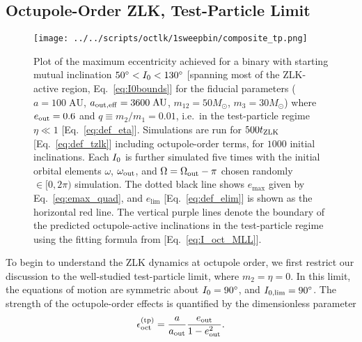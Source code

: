 \documentclass[
        fleqn,
        usenatbib,
    ]{mnras}
\newlength{\colummwidth}
\begin{document}
\subsection{Octupole-Order ZLK, Test-Particle Limit}

\begin{figure}
    \centering
    \texttt{[image: ../../scripts/octlk/1sweepbin/composite\_tp.png]}
    \caption{Plot of the maximum eccentricity achieved for a binary with
    starting mutual inclination $50^\circ < I_{\rm 0} < 130^\circ$ [spanning
    most of the ZLK-active region, Eq.~\eqref{eq:I0bounds}] for the fiducial
    parameters ($a = 100\;\mathrm{AU}$, $a_{\rm out, eff} = 3600\;\mathrm{AU}$,
    $m_{12} = 50M_{\odot}$, $m_3 = 30M_{\odot}$) where $e_{\rm out} = 0.6$ and
    $q \equiv m_2 / m_1 = 0.01$, i.e.\ in the test-particle regime $\eta \ll 1$
    [Eq.~\eqref{eq:def_eta}]. Simulations are run for $500t_{\rm ZLK}$
    [Eq.~\eqref{eq:def_tzlk}] including octupole-order terms, for $1000$ initial
    inclinations. Each $I_{\rm 0}$ is further simulated five times with the
    initial orbital elements $\omega$, $\omega_{\rm out}$, and $\Omega =
    \Omega_{\rm out} - \pi$ chosen randomly $\in [0, 2\pi)$%
    simulation. The dotted black line shows $e_{\max}$ given by
    Eq.~\eqref{eq:emax_quad}, and $e_{\lim}$ [Eq.~\eqref{eq:def_elim}] is shown
    as the horizontal red line. The vertical purple lines denote the boundary of
    the predicted octupole-active inclinations in the test-particle regime using
    the fitting formula from \citet{MLL16} [Eq.~\eqref{eq:I_oct_MLL}].
    }\label{fig:composite_tp}
\end{figure}

To begin to understand the ZLK dynamics at octupole order, we first restrict our
discussion to the well-studied test-particle limit, where $m_2 = \eta = 0$. In
this limit, the equations of motion are symmetric about $I_{\rm 0} = 90^\circ$,
and $I_{\rm 0, \lim} = 90^\circ$. The strength of the octupole-order effects is
quantified by the dimensionless parameter \citep{katz2011long,
lithwick2011eccentric, naoz2012formation}
\begin{equation}
    \epsilon_{\rm oct}^{\rm (tp)} = \frac{a}{a_{\rm
        out}} \frac{e_{\rm out}}{1 - e_{\rm out}^2}.\label{eq:eps_oct_tp}
\end{equation}
\end{document}
